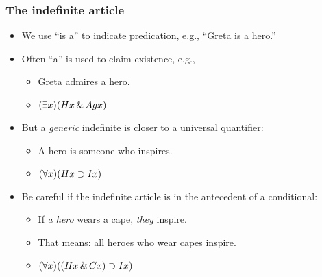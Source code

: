 \begin{frame}
\frametitle{The indefinite article}

\begin{itemize}[<+->]
  \item We use ``is a'' to indicate predication, e.g., ``Greta is a hero.''
  \item Often ``a'' is used to claim existence, e.g.,
  \begin{itemize}[<+->]
    \item[] Greta admires a hero.
    \item[] \alert{$(\exists x) (Hx \,\&\, Agx)$}
  \end{itemize}
  \item But a \emph{generic} indefinite is closer to a
  universal quantifier:
  \begin{itemize}[<+->]
    \item[] A hero is someone who inspires.
    \item[] \alert{$(\forall x)(Hx \supset Ix)$}
  \end{itemize}
  \item Be careful if the indefinite article is in the antecedent of a conditional:
  \begin{itemize}[<+->]
    \item[] If \emph{a hero} wears a cape, \emph{they} inspire.
    \item[] That means: all heroes who wear capes inspire.
    \item[] \alert{$(\forall x)((Hx \,\&\, Cx) \supset Ix)$}
  \end{itemize}
\end{itemize}
\end{frame}

